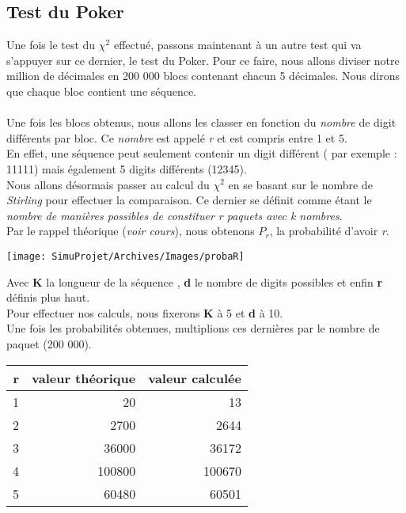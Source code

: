 \documentclass[french]{article}
\begin{document}
\subsection{Test du Poker}
Une fois le test du $\chi^{2}$ effectué, passons maintenant à un autre test qui va s'appuyer sur ce dernier, le test du Poker. Pour ce faire, nous allons diviser notre million de décimales en 200 000 blocs contenant chacun 5 décimales. Nous dirons que chaque bloc contient une séquence.
\\
\\
Une fois les blocs obtenus, nous allons les classer en fonction du \textit{nombre} de digit différents par bloc. Ce \textit{nombre} est appelé \textit{r} et est compris entre 1 et 5.
\\
En effet, une séquence peut seulement contenir un digit différent ( par exemple : 11111) mais également 5 digits différents (12345).
\\
Nous allons désormais passer au calcul du $\chi^{2}$ en se basant sur le nombre de \textit{Stirling} pour
effectuer la comparaison. Ce dernier se définit comme étant le \textit{nombre de manières possibles de constituer r paquets avec k nombres}.
\\
Par le rappel théorique (\textit{voir cours}), nous obtenons $P_{r}$, la probabilité d'avoir \textit{r}.

	\begin{center}
		\texttt{[image: SimuProjet/Archives/Images/probaR]}
	\end{center}

Avec \textbf{K} la longueur de la séquence , \textbf{d} le nombre de digits possibles et enfin \textbf{r}
définis plus haut.
\\
Pour effectuer nos calculs, nous fixerons \textbf{K} à 5 et \textbf{d} à 10.
\\
Une fois les probabilités obtenues, multiplions ces dernières par le nombre de paquet (200 000).

\centering
	\begin{tabular}{|r|r|r|}
		\hline
		r & valeur théorique & valeur calculée\\
		\hline
		1 & 20 & 13\\
		2 & 2700 & 2644\\
		3 & 36000 & 36172\\
		4 & 100800 & 100670\\
		5 & 60480 & 60501\\
		\hline
	\end{tabular}
\end{document}
